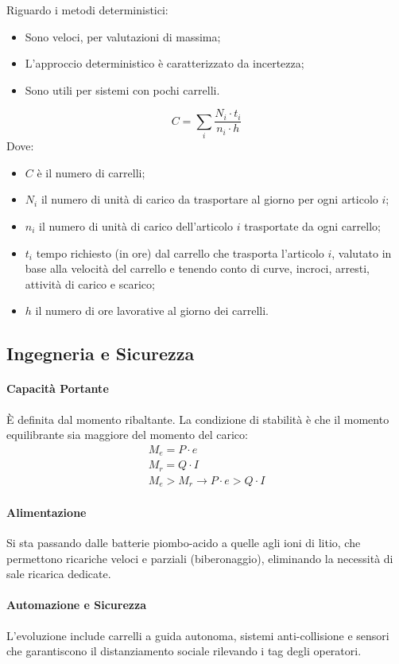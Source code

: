 Riguardo i metodi deterministici:
\begin{itemize}
    \item Sono veloci, per valutazioni di massima;
    \item L'approccio deterministico è caratterizzato da incertezza;
    \item Sono utili per sistemi con pochi carrelli.
\end{itemize}
\[
    C = \sum_{i}{\frac{N_{i} \cdot t_{i}}{n_{i} \cdot h}}
\]
Dove:
\begin{itemize}
    \item $ C $ è il numero di carrelli;
    \item $ N_{i} $ il numero di unità di carico da trasportare al giorno per ogni articolo $ i $;
    \item $ n_{i} $ il numero di unità di carico dell'articolo $ i $ trasportate da ogni carrello;
    \item $ t_{i} $ tempo richiesto (in ore) dal carrello che trasporta l'articolo $ i $, valutato in base alla velocità del carrello e tenendo conto di curve, incroci, arresti, attività di carico e scarico;
    \item $ h $ il numero di ore lavorative al giorno dei carrelli.
\end{itemize}

%
\subsection{Ingegneria e Sicurezza}
%
\paragraph{Capacità Portante} È definita dal momento ribaltante. La condizione di stabilità è che il momento equilibrante sia maggiore del momento del carico:
\begin{gather*}
    M_{e} = P \cdot e \\
    M_{r} = Q \cdot I \\
    M_{e} > M_{r} \to P \cdot e > Q \cdot I
\end{gather*}
%
\paragraph{Alimentazione} Si sta passando dalle batterie piombo-acido a quelle agli ioni di litio, che permettono ricariche veloci e parziali (biberonaggio), eliminando la necessità di sale ricarica dedicate.

%
\paragraph{Automazione e Sicurezza} L'evoluzione include carrelli a guida autonoma, sistemi anti-collisione e sensori che garantiscono il distanziamento sociale rilevando i tag degli operatori.

